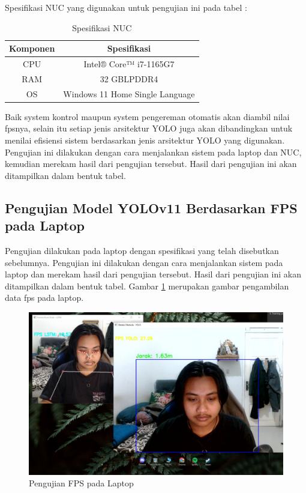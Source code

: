 Spesifikasi NUC yang digunakan untuk pengujian ini pada tabel  :

\begin{longtable}{|c|c|}
    \caption{Spesifikasi NUC}
    \label{tb:Spesifikasi NUC}                             \\
    \hline   
    \rowcolor[HTML]{C0C0C0}
    \textbf{Komponen} & \textbf{Spesifikasi} \\
    \hline
  CPU            &  Intel® Core™ i7-1165G7        \\
  RAM            & 32 GBLPDDR4        \\
  OS            & Windows 11 Home Single Language           \\
  \hline
\end{longtable}

Baik system kontrol maupun system pengereman otomatis akan diambil nilai fpsnya, selain itu setiap jenis arsitektur YOLO juga akan dibandingkan untuk menilai efisiensi sistem berdasarkan jenis arsitektur YOLO yang digunakan. Pengujian ini dilakukan dengan cara menjalankan sistem pada laptop dan NUC, kemudian merekam hasil dari pengujian tersebut. Hasil dari pengujian ini akan ditampilkan dalam bentuk tabel.

\newpage

\subsection{Pengujian Model YOLOv11 Berdasarkan FPS pada Laptop}

Pengujian dilakukan pada laptop dengan spesifikasi yang telah disebutkan sebelumnya. Pengujian ini dilakukan dengan cara menjalankan sistem pada laptop dan merekam hasil dari pengujian tersebut. Hasil dari pengujian ini akan ditampilkan dalam bentuk tabel. Gambar \ref{fig:Foto pengujian fps laptop} merupakan gambar pengambilan data fps pada laptop.

\begin{figure} [H] \centering
  \includegraphics[scale=0.3]{gambar/devafps.jpg}
  \caption{Pengujian FPS pada Laptop}
  \label{fig:Foto pengujian fps laptop}
\end{figure}

